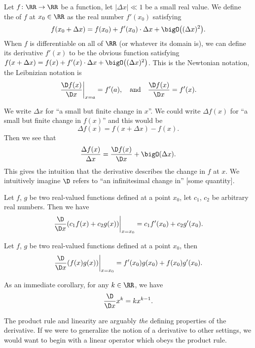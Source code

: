 \begin{definition}\label{calculus-0006}%
Let $f\colon\RR\to\RR$ be a function, let $|\Delta x|\ll1$ be a small
real value. We define the  of $f$ at $x_{0}\in\RR$ as
the real number $f'(x_{0})$ satisfying
\[f(x_{0}+\Delta x)=f(x_{0})+f'(x_{0})\cdot\Delta x+\bigO\bigl((\Delta x)^{2}\bigr).\]
When $f$ is differentiable on all of $\RR$ (or whatever its domain is),
we can define its derivative $f'(x)$ to be the obvious function
satisfying $f(x+\Delta x)=f(x)+f'(x)\cdot\Delta x+\bigO\bigl((\Delta x)^{2}\bigr)$.
This is the Newtonian notation, the Leibnizian notation is
\begin{equation}
\left.\frac{\D f(x)}{\D x}\right|_{x=a}=f'(a),\quad\mbox{and}\quad\frac{\D f(x)}{\D x}=f'(x).
\end{equation}

\begin{node}[Notation]\label{calculus-000W}%
We write $\Delta x$ for ``a small but finite change in $x$''. We could
write $\Delta f(x)$ for ``a small but finite change in $f(x)$'' and this
would be
\[\Delta f(x) = f(x+\Delta x)-f(x).\]
Then we see that
\[\frac{\Delta f(x)}{\Delta x} = \frac{\D f(x)}{\D x}+\bigO(\Delta x).\]
This gives the intuition that the derivative describes the change in $f$
at $x$. We intuitively imagine $\D$ refers to ``an infinitesimal change in''
[some quantity].
\end{node}

\begin{theorem}[Linearity]\label{calculus-0007}%
Let $f$, $g$ be two real-valued functions defined at a point $x_{0}$,
let $c_{1}$, $c_{2}$ be arbitrary real numbers. Then we have
\[\left.\frac{\D}{\D x}(c_{1}f(x)+c_{2}g(x))\right|_{x=x_{0}}=c_{1}f'(x_{0})+c_{2}g'(x_{0}).\]
\end{theorem}

\begin{theorem}\label{calculus-0008}%
Let $f$, $g$ be two real-valued functions defined at a point $x_{0}$,
then
\[\left.\frac{\D}{\D x}(f(x)g(x))\right|_{x=x_{0}}=f'(x_{0})g(x_{0})+f(x_{0})g'(x_{0}).\]
\end{theorem}

\begin{node}\label{calculus-0009}%
As an immediate corollary, for any $k\in\RR$, we have
\[\frac{\D}{\D x}x^{k}=kx^{k-1}.\]
\end{node}

\begin{node}\label{calculus-000A}%
The product rule and linearity are arguably \emph{the} defining
properties of the derivative. If we were to generalize the notion of a
derivative to other settings, we would want to begin with a linear
operator which obeys the product rule.
\end{node}


\end{definition}
